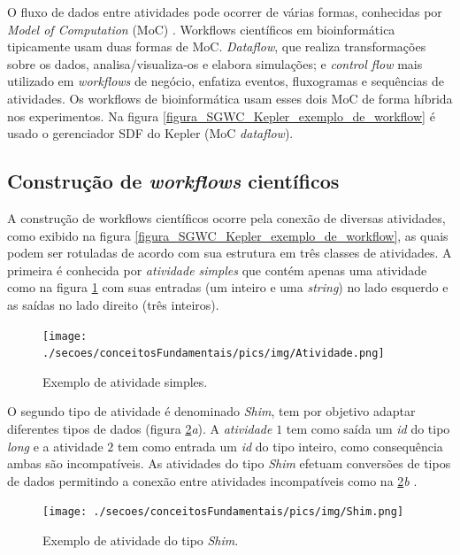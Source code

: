 O fluxo de dados entre atividades pode ocorrer de várias formas, conhecidas por \emph{Model of Computation} (MoC) \cite{Ludascher2006}. Workflows científicos em bioinformática tipicamente usam duas formas de MoC. \emph{Dataflow}, que realiza transformações sobre os dados, analisa/visualiza-os e elabora simulações; e \emph{control flow} mais utilizado em \emph{workflows} de negócio, enfatiza eventos, fluxogramas e sequências de atividades. Os workflows de bioinformática usam esses dois MoC de forma híbrida nos experimentos. Na figura \ref{figura_SGWC_Kepler_exemplo_de_workflow} é usado o gerenciador SDF do Kepler (MoC \emph{dataflow}).

\subsection{Construção de \emph{workf\mbox{}lows} científ\mbox{}icos}
A construção de workflows científicos ocorre pela conexão de diversas atividades, como exibido na figura \ref{figura_SGWC_Kepler_exemplo_de_workflow}, as quais podem ser rotuladas de acordo com sua estrutura em três classes de atividades. A primeira é conhecida por \emph{atividade simples} que contém apenas uma atividade  \cite{Garijo2012} como na figura \ref{figura_atividade_simples} com suas entradas (um inteiro e uma \emph{string}) no lado esquerdo e as saídas no lado direito (três inteiros).
\begin{figure}[!hbt]
    \centering  
    \caption{Exemplo de atividade simples.}
    \texttt{[image: ./secoes/conceitosFundamentais/pics/img/Atividade.png]}    
	\label{figura_atividade_simples}
\end{figure}

O segundo tipo de atividade é denominado \emph{Shim}, tem por objetivo adaptar diferentes tipos de dados (figura \ref{figura_atividade_shim}\emph{a}). A \emph{atividade} \(1\) tem como saída um \emph{id} do tipo \emph{long} e a atividade \(2\) tem como entrada um \emph{id} do tipo inteiro, como consequência ambas são incompatíveis. As atividades do tipo \emph{Shim} efetuam conversões de tipos de dados permitindo a conexão entre atividades incompatíveis como na \ref{figura_atividade_shim}\emph{b} \cite{Lin2009}.
\begin{figure}[!hbt]
    \centering  
    \caption{Exemplo de atividade do tipo \emph{Shim}.}
    \texttt{[image: ./secoes/conceitosFundamentais/pics/img/Shim.png]}    
	\label{figura_atividade_shim}
\end{figure}

